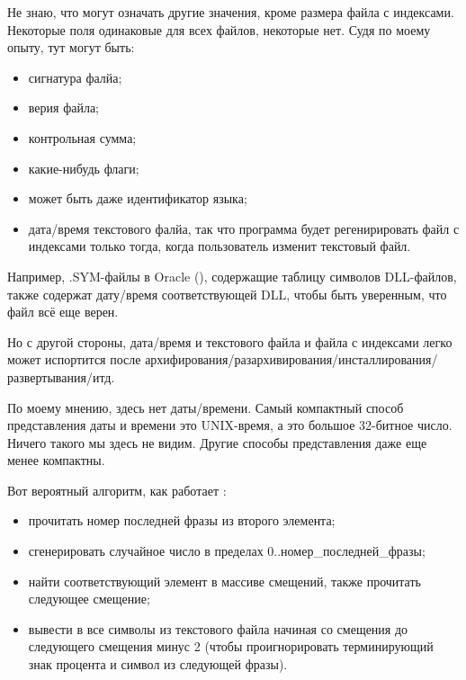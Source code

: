 \begin{figure}[H]
\centering
{}
\end{figure}

Не знаю, что могут означать другие значения, кроме размера файла с индексами.
Некоторые поля одинаковые для всех файлов, некоторые нет.
Судя по моему опыту, тут могут быть:

\begin{itemize}
\item сигнатура фалйа;
\item верия файла;
\item контрольная сумма;
\item какие-нибудь флаги;
\item может быть даже идентификатор языка;
\item дата/время текстового фалйа, так что программа  будет регенирировать файл с индексами только тогда, когда
пользователь изменит текстовый файл.
\end{itemize}

Например, .SYM-файлы в Oracle (), содержащие таблицу символов DLL-файлов,
также содержат дату/время соответствующей DLL, чтобы быть уверенным, что файл всё еще верен.

Но с другой стороны, дата/время и текстового файла и файла с индексами легко может испортится после
архифирования/разархивирования/инсталлирования/развертывания/итд.

По моему мнению, здесь нет даты/времени. Самый компактный способ представления даты и времени это UNIX-время,
а это большое 32-битное число. Ничего такого мы здесь не видим. Другие способы представления даже еще менее компактны.

Вот вероятный алгоритм, как работает :

\begin{itemize}
\item прочитать номер последней фразы из второго элемента;
\item сгенерировать случайное число в пределах 0..номер\_последней\_фразы;
\item найти соответствующий элемент в массиве смещений, также прочитать следующее смещение;
\item вывести в  все символы из текстового файла начиная со смещения до следующего смещения минус 2 (чтобы
проигнорировать терминирующий знак процента и символ из следующей фразы).
\end{itemize}

